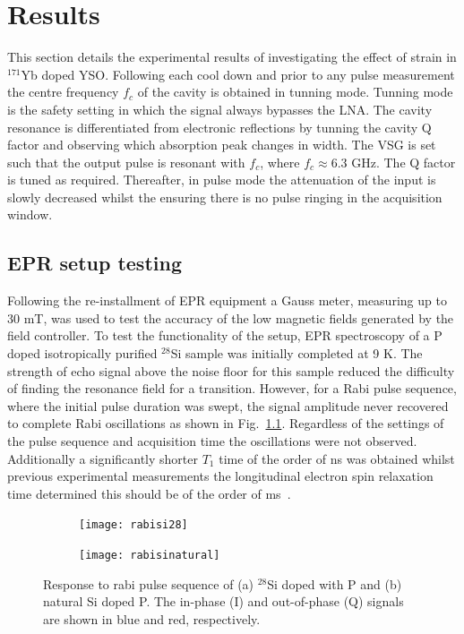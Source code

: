 \chapter{Results}
This section details the experimental results of investigating the effect of strain in $^{171}$Yb doped YSO. Following each cool down and prior to any pulse measurement the centre frequency $f_{c}$ of the cavity is obtained in tunning mode. Tunning mode is the safety setting in which the signal always bypasses the LNA. The cavity resonance is differentiated from electronic reflections by tunning the cavity Q factor and observing which absorption peak changes in width. The VSG is set such that the output pulse is resonant with $f_{c}$, where $f_{c}\approx 6.3$ GHz. The Q factor is tuned as required. Thereafter, in pulse mode the attenuation of the input is slowly decreased whilst the ensuring there is no pulse ringing in the acquisition window. 


\section{EPR setup testing}
Following the re-installment of EPR equipment a Gauss meter, measuring up to 30 mT, was used to test the accuracy of the low magnetic fields generated by the field controller. To test the functionality of the setup, EPR spectroscopy of a P doped isotropically purified $^{28}$Si sample was initially completed at 9 K. The strength of echo signal above the noise floor for this sample reduced the difficulty of finding the resonance field for a transition. However, for a Rabi pulse sequence, where the initial pulse duration was swept, the signal amplitude never recovered to complete Rabi oscillations as shown in Fig.~\ref{fig:rabisi28}. Regardless of the settings of the pulse sequence and acquisition time the oscillations were not observed. Additionally a significantly shorter $T_{1}$ time of the order of ns was obtained whilst previous experimental measurements the longitudinal electron spin relaxation time determined this should be of the order of ms~\citep{PhysRevB.68.193207}.  

\begin{figure}[H]
    \centering
    \begin{subfigure}[b]{0.45\textwidth}
        \centering
        \texttt{[image: rabisi28]}
        \caption{\label{fig:rabisi28}}
    \end{subfigure}
    \begin{subfigure}[b]{0.45\textwidth}
        \centering
        \texttt{[image: rabisinatural]}
   \caption{\label{fig:rabisinatural}}
   \end{subfigure}
    \caption{Response to rabi pulse sequence of (a) $^28$Si doped with P and (b) natural Si doped P. The in-phase (I) and out-of-phase (Q) signals are shown in blue and red, respectively.}
\end{figure}

